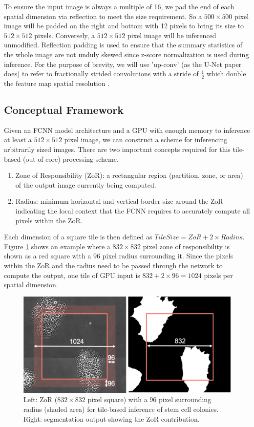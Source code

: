 \documentclass[runningheads]{llncs}
\begin{document}
To ensure the input image is always a multiple of 16, we pad the end of each spatial dimension via reflection to meet the size requirement. So a $500 \times 500$ pixel image will be padded on the right and bottom with 12 pixels to bring its size to $512 \times 512$ pixels. Conversely, a $512 \times 512$ pixel image will be inferenced unmodified. Reflection padding is used to ensure that the summary statistics of the whole image are not unduly skewed since z-score normalization is used during inference. 
For the purpose of brevity, we will use 'up-conv' (as the U-Net paper does) to refer to fractionally strided convolutions with a stride of $\frac{1}{2}$ which double the feature map spatial resolution \cite{Dumoulin2018}.

\subsection{Conceptual Framework}

Given an FCNN model architecture and a GPU with enough memory to inference at least a $512 \times 512$ pixel image, we can construct a scheme for inferencing arbitrarily sized images. There are two important concepts required for this tile-based (out-of-core) processing scheme. 
\begin{enumerate}
	\item Zone of Responsibility (ZoR): a rectangular region (partition, zone, or area) of the output image currently being computed.
	\item Radius: minimum horizontal and vertical border size around the ZoR indicating the local context that the FCNN requires to accurately compute all pixels within the ZoR.
\end{enumerate}

Each dimension of a square tile is then defined as $TileSize = ZoR + 2 \times Radius$. 
Figure \ref{fig:zor} shows an example where a $832 \times 832$ pixel zone of responsibility is shown as a red square with a $96$ pixel radius surrounding it. 
Since the pixels within the ZoR and the radius need to be passed through the network to compute the output, one tile of GPU input is $832 + 2 \times 96 = 1024$ pixels per spatial dimension.

\begin{figure}[h!]
	\centering
		\includegraphics[width=\linewidth]{figs/zor.png}
	\caption{Left: ZoR ($832 \times 832$ pixel square) with a $96$ pixel surrounding radius (shaded area) for tile-based inference of stem cell colonies. Right: segmentation output showing the ZoR contribution.}
	\label{fig:zor}
\end{figure}
\end{document}
